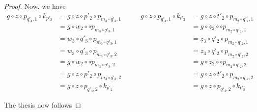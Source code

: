 \begin{proof}
Now, we have
\[
\begin{split}
	g\circ z\circ p_{q'_4,1} \circ k_{p'_2}&=g\circ z\circ p'_2\circ p_{m_3\circ q'_3, 1}\\&=g\circ w_2\circ \circ  p_{m_3\circ q'_3, 1}\\&=w_3\circ q'_3\circ p_{m_3\circ q'_3, 1}\\&=w_3\circ q'_3\circ p_{m_3\circ q'_3, 2}\\&=g\circ w_2\circ \circ  p_{m_3\circ q'_3, 2}\\&=g\circ z\circ p'_2\circ p_{m_3\circ q'_3, 2}\\&=g\circ z\circ p_{q'_4,2} \circ k_{p'_2}
\end{split} \qquad 
\begin{split}
g\circ z\circ p_{q'_4,1} \circ k_{t'_2}&=g\circ z\circ t'_2\circ p_{m_2\circ q'_2, 1}\\&=g\circ z_2\circ \circ  p_{m_2\circ q'_2, 1}\\&=z_3\circ q'_2\circ p_{m_2\circ q'_2, 1}\\&=z_3\circ q'_2\circ p_{m_2\circ q'_2, 2}\\&=g\circ z_2\circ \circ  p_{m_2\circ q'_2, 2}\\&=g\circ z\circ t'_2\circ p_{m_2\circ q'_2, 2}\\&=g\circ z\circ p_{q'_4,2} \circ k_{t'_2}
\end{split}
\]

The thesis now follows 







\end{proof}


